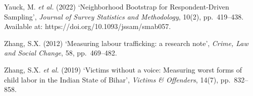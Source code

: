 \documentclass[
  12pt,
  letterpaper,
  DIV=11,
  numbers=noendperiod]{scrartcl}
\begin{document}
Yauck, M. \emph{et al.} (2022) `Neighborhood Bootstrap for
Respondent-Driven Sampling', \emph{Journal of Survey Statistics and
Methodology}, 10(2), pp.~419--438. Available at:
https://doi.org/10.1093/jssam/smab057.

Zhang, S.X. (2012) `Measuring labour trafficking: a research note',
\emph{Crime, Law and Social Change}, 58, pp.~469--482.

Zhang, S.X. \emph{et al.} (2019) `Victims without a voice: Measuring
worst forms of child labor in the Indian State of Bihar', \emph{Victims
\& Offenders}, 14(7), pp.~832--858.


\printbibliography
\end{document}
